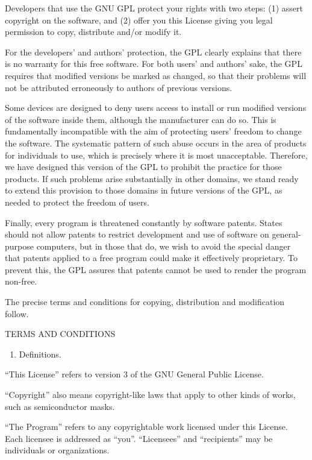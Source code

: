 \documentclass[letterpaper,10pt,english]{sphinxmanual}
\begin{document}
Developers that use the GNU GPL protect your rights with two steps:
(1) assert copyright on the software, and (2) offer you this License
giving you legal permission to copy, distribute and/or modify it.

For the developers’ and authors’ protection, the GPL clearly explains
that there is no warranty for this free software.  For both users’ and
authors’ sake, the GPL requires that modified versions be marked as
changed, so that their problems will not be attributed erroneously to
authors of previous versions.

Some devices are designed to deny users access to install or run
modified versions of the software inside them, although the manufacturer
can do so.  This is fundamentally incompatible with the aim of
protecting users’ freedom to change the software.  The systematic
pattern of such abuse occurs in the area of products for individuals to
use, which is precisely where it is most unacceptable.  Therefore, we
have designed this version of the GPL to prohibit the practice for those
products.  If such problems arise substantially in other domains, we
stand ready to extend this provision to those domains in future versions
of the GPL, as needed to protect the freedom of users.

Finally, every program is threatened constantly by software patents.
States should not allow patents to restrict development and use of
software on general-purpose computers, but in those that do, we wish to
avoid the special danger that patents applied to a free program could
make it effectively proprietary.  To prevent this, the GPL assures that
patents cannot be used to render the program non-free.

The precise terms and conditions for copying, distribution and
modification follow.

TERMS AND CONDITIONS
\begin{enumerate}
%
\setcounter{enumi}{-1}
\item {} 
Definitions.

\end{enumerate}

“This License” refers to version 3 of the GNU General Public License.

“Copyright” also means copyright-like laws that apply to other kinds of
works, such as semiconductor masks.

“The Program” refers to any copyrightable work licensed under this
License.  Each licensee is addressed as “you”.  “Licensees” and
“recipients” may be individuals or organizations.
\end{document}
